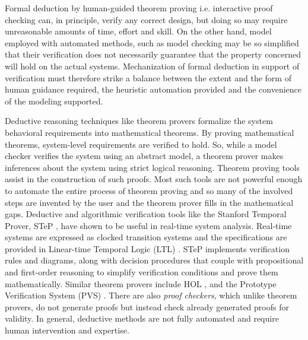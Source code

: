 Formal deduction by human-guided theorem proving i.e. interactive proof checking can, in principle, verify any correct design, but doing so may require unreasonable amounts of time, effort and skill. On the other hand, model employed with automated methods, such as model checking may be so simplified that their verification does not necessarily guarantee that the property concerned will hold on the actual systems. Mechanization of formal deduction in support of verification must therefore strike a balance between the extent and the form of human guidance required, the heuristic automation provided and the convenience of the modeling supported. 


Deductive reasoning techniques like theorem provers formalize the system behavioral requirements into mathematical theorems. By proving mathematical theorems, system-level requirements are verified to hold. So, while a model checker verifies the system using an abstract model, a theorem prover makes inferences about the system using strict logical reasoning. Theorem proving tools assist in the construction of such proofs. Most such tools are not powerful enough to automate the entire process of theorem proving and so many of the involved steps are invented by the user and the theorem prover fills in the mathematical gaps. Deductive and algorithmic verification tools like the Stanford Temporal Prover, STeP \cite{bjorner2001deductive}, have shown to be useful in real-time system analysis. Real-time systems are expressed as clocked transition systems and the specifications are provided in Linear-time Temporal Logic (LTL) \cite{gabbay1994temporal}. STeP implements verification rules and diagrams, along with decision procedures that couple with propositional and first-order reasoning to simplify verification conditions and prove them mathematically. Similar theorem provers include HOL \cite{gordon1993introduction}, and the Prototype Verification System (PVS) \cite{owre1992pvs}. There are also \emph{proof checkers}, which unlike theorem provers, do not generate proofs but instead check already generated proofs for validity. In general, deductive methods are not fully automated and require human intervention and expertise. 

